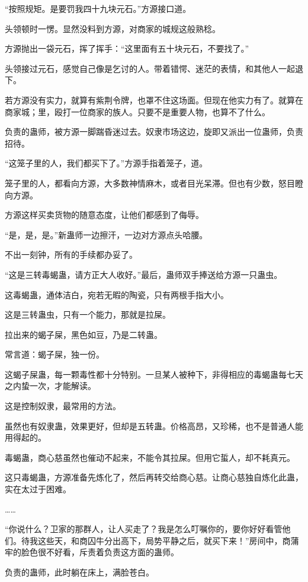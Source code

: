 \begin{this_body}
“按照规矩。是要罚我四十九块元石。”方源接口道。

头领顿时一愣。显然没料到方源，对商家的城规这般熟稔。

方源抛出一袋元石，挥了挥手：“这里面有五十块元石，不要找了。”

头领接过元石，感觉自己像是乞讨的人。带着错愕、迷茫的表情，和其他人一起退下。

若方源没有实力，就算有紫荆令牌，也罩不住这场面。但现在他实力有了。就算在商家城；里，殴打一位商家的族人。只要不是重要人物，也算不了什么。

负责的蛊师，被方源一脚踹昏迷过去。奴隶市场这边，旋即又派出一位蛊师，负责招待。

“这笼子里的人，我们都买下了。”方源手指着笼子，道。

笼子里的人，都看向方源，大多数神情麻木，或者目光呆滞。但也有少数，怒目瞪向方源。

方源这样买卖货物的随意态度，让他们都感到了侮辱。

“是，是，是。”新蛊师一边擦汗，一边对方源点头哈腰。

不出一刻钟，所有的手续都办妥了。

“这是三转毒蝎蛊，请方正大人收好。”最后，蛊师双手捧送给方源一只蛊虫。

这毒蝎蛊，通体洁白，宛若无暇的陶瓷，只有两根手指大小。

这是三转蛊虫，只有一个能力，那就是拉屎。

拉出来的蝎子屎，黑色如豆，乃是二转蛊。

常言道：蝎子屎，独一份。

这蝎子屎蛊，每一颗毒性都十分特别。一旦某人被种下，非得相应的毒蝎蛊每七天之内蛰一次，才能解读。

这是控制奴隶，最常用的方法。

虽然也有奴隶蛊，效果更好，但却是五转蛊。价格高昂，又珍稀，也不是普通人能用得起的。

毒蝎蛊，商心慈虽然也催动不起来，不能令其拉屎。但用它蜇人，却不耗真元。

这只毒蝎蛊，方源准备先炼化了，然后再转交给商心慈。让商心慈独自炼化此蛊，实在太过于困难。

……

“你说什么？卫家的那群人，让人买走了？我是怎么叮嘱你的，要你好好看管他们。待我这些天，和商囚牛分出高下，局势平静之后，就买下来！”房间中，商蒲牢的脸色很不好看，斥责着负责这方面的蛊师。

负责的蛊师，此时躺在床上，满脸苍白。


\end{this_body}
